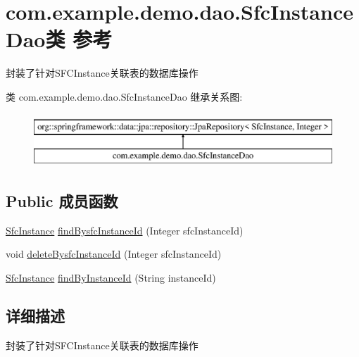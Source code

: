 \hypertarget{interfacecom_1_1example_1_1demo_1_1dao_1_1_sfc_instance_dao}{}\section{com.\+example.\+demo.\+dao.\+Sfc\+Instance\+Dao类 参考}
\label{interfacecom_1_1example_1_1demo_1_1dao_1_1_sfc_instance_dao}


封装了针对\+S\+F\+C\+Instance关联表的数据库操作  


类 com.\+example.\+demo.\+dao.\+Sfc\+Instance\+Dao 继承关系图\+:\begin{figure}[H]
\begin{center}
\leavevmode
\includegraphics[height=2.000000cm]{interfacecom_1_1example_1_1demo_1_1dao_1_1_sfc_instance_dao}
\end{center}
\end{figure}
\subsection*{Public 成员函数}
\begin{DoxyCompactItemize}
\item 
\mbox{\hyperlink{classcom_1_1example_1_1demo_1_1modular_1_1_sfc_instance}{Sfc\+Instance}} \mbox{\hyperlink{interfacecom_1_1example_1_1demo_1_1dao_1_1_sfc_instance_dao_a80f5c670dd6055d25f4b54823f7344f7}{find\+Bysfc\+Instance\+Id}} (Integer sfc\+Instance\+Id)
\item 
void \mbox{\hyperlink{interfacecom_1_1example_1_1demo_1_1dao_1_1_sfc_instance_dao_aab0913bc177642c684dc2b13de4003da}{delete\+Bysfc\+Instance\+Id}} (Integer sfc\+Instance\+Id)
\item 
\mbox{\hyperlink{classcom_1_1example_1_1demo_1_1modular_1_1_sfc_instance}{Sfc\+Instance}} \mbox{\hyperlink{interfacecom_1_1example_1_1demo_1_1dao_1_1_sfc_instance_dao_ae4f1cc7e89ebf02e8878f509e6d9f7e8}{find\+By\+Instance\+Id}} (String instance\+Id)
\end{DoxyCompactItemize}


\subsection{详细描述}
封装了针对\+S\+F\+C\+Instance关联表的数据库操作 

